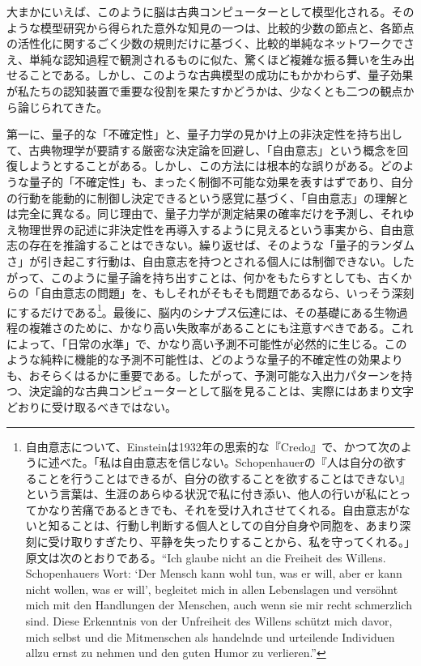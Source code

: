 \hypertarget{srcpage:366}{}\label{srcpage:366}
大まかにいえば、このように脳は古典コンピューターとして模型化される。そのような模型研究から得られた意外な知見の一つは、比較的少数の節点と、各節点の活性化に関するごく少数の規則だけに基づく、比較的単純なネットワークでさえ、単純な認知過程で観測されるものに似た、驚くほど複雑な振る舞いを生み出せることである。しかし、このような古典模型の成功にもかかわらず、量子効果が私たちの認知装置で重要な役割を果たすかどうかは、少なくとも二つの観点から論じられてきた。

第一に、量子的な「不確定性」と、量子力学の見かけ上の非決定性を持ち出して、古典物理学が要請する厳密な決定論を回避し、「自由意志」という概念を回復しようとすることがある。しかし、この方法には根本的な誤りがある。どのような量子的「不確定性」も、まったく制御不可能な効果を表すはずであり、自分の行動を能動的に制御し決定できるという感覚に基づく、「自由意志」の理解とは完全に異なる。同じ理由で、量子力学が測定結果の確率だけを予測し、それゆえ物理世界の記述に非決定性を再導入するように見えるという事実から、自由意志の存在を推論することはできない。繰り返せば、そのような「量子的ランダムさ」が引き起こす行動は、自由意志を持つとされる個人には制御できない。したがって、このように量子論を持ち出すことは、何かをもたらすとしても、古くからの「自由意志の問題」を、もしそれがそもそも問題であるなら、いっそう深刻にするだけである\footnote{自由意志について、Einsteinは1932年の思索的な『Credo』\cite{ref503}で、かつて次のように述べた。「私は自由意志を信じない。Schopenhauerの『人は自分の欲することを行うことはできるが、自分の欲することを欲することはできない』という言葉は、生涯のあらゆる状況で私に付き添い、他人の行いが私にとってかなり苦痛であるときでも、それを受け入れさせてくれる。自由意志がないと知ることは、行動し判断する個人としての自分自身や同胞を、あまり深刻に受け取りすぎたり、平静を失ったりすることから、私を守ってくれる。」原文は次のとおりである。``Ich glaube nicht an die Freiheit des Willens. Schopenhauers Wort: `Der Mensch kann wohl tun, was er will, aber er kann nicht wollen, was er will', begleitet mich in allen Lebenslagen und versöhnt mich mit den Handlungen der Menschen, auch wenn sie mir recht schmerzlich sind. Diese Erkenntnis von der Unfreiheit des Willens schützt mich davor, mich selbst und die Mitmenschen als handelnde und urteilende Individuen allzu ernst zu nehmen und den guten Humor zu verlieren.''}。最後に、脳内のシナプス伝達には、その基礎にある生物過程の複雑さのために、かなり高い失敗率があることにも注意すべきである\cite{ref504}。これによって、「日常の水準」で、かなり高い予測不可能性が必然的に生じる。このような純粋に機能的な予測不可能性は、どのような量子的不確定性の効果よりも、おそらくはるかに重要である。したがって、予測可能な入出力パターンを持つ、決定論的な古典コンピューターとして脳を見ることは、実際にはあまり文字どおりに受け取るべきではない。



